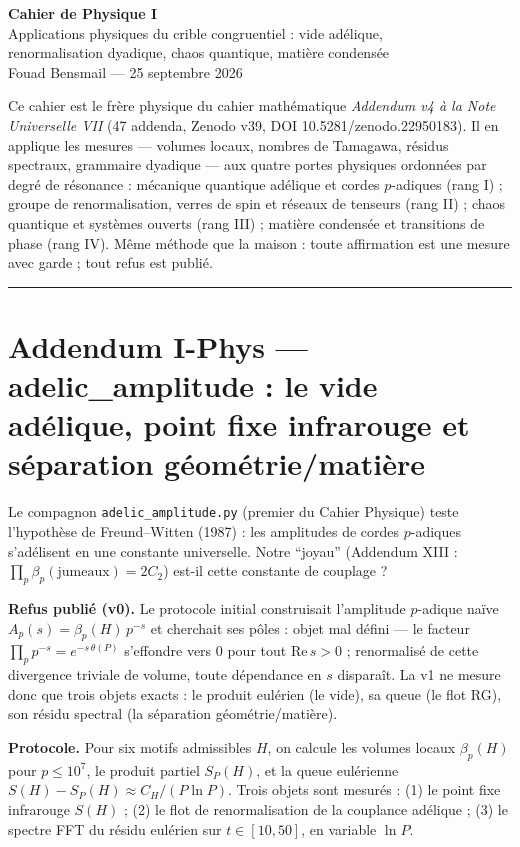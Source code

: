 \documentclass[11pt,a4paper]{article}
\begin{document}
\begin{center}
{\LARGE\textbf{Cahier de Physique I}}\\
\large Applications physiques du crible congruentiel : vide adélique,\\
renormalisation dyadique, chaos quantique, matière condensée\\
Fouad Bensmail --- 25 septembre 2026
\end{center}

Ce cahier est le frère physique du cahier mathématique \emph{Addendum v4 à la
Note Universelle VII} (47 addenda, Zenodo v39, DOI 10.5281/zenodo.22950183).
Il en applique les mesures --- volumes locaux, nombres de Tamagawa, résidus
spectraux, grammaire dyadique --- aux quatre portes physiques ordonnées par
degré de résonance : mécanique quantique adélique et cordes $p$-adiques
(rang I) ; groupe de renormalisation, verres de spin et réseaux de tenseurs
(rang II) ; chaos quantique et systèmes ouverts (rang III) ; matière
condensée et transitions de phase (rang IV). Même méthode que la maison :
toute affirmation est une mesure avec garde ; tout refus est publié.

\vspace{0.5cm}
\hrule
\vspace{0.5cm}

\section*{Addendum I-Phys --- adelic\_amplitude : le vide adélique, point fixe infrarouge et séparation géométrie/matière}

Le compagnon \texttt{adelic\_amplitude.py} (premier du Cahier Physique) teste
l'hypothèse de Freund--Witten (1987) : les amplitudes de cordes $p$-adiques
s'adélisent en une constante universelle. Notre ``joyau'' (Addendum XIII :
$\prod_p \beta_p(\text{jumeaux}) = 2C_2$) est-il cette constante de
couplage ?

\textbf{Refus publié (v0).} Le protocole initial construisait l'amplitude
$p$-adique naïve $A_p(s) = \beta_p(H)\,p^{-s}$ et cherchait ses pôles :
objet mal défini --- le facteur $\prod_p p^{-s} = e^{-s\,\theta(P)}$
s'effondre vers $0$ pour tout $\mathrm{Re}\,s > 0$ ; renormalisé de cette
divergence triviale de volume, toute dépendance en $s$ disparaît. La v1 ne
mesure donc que trois objets exacts : le produit eulérien (le vide), sa
queue (le flot RG), son résidu spectral (la séparation géométrie/matière).

\textbf{Protocole.} Pour six motifs admissibles $H$, on calcule les volumes
locaux $\beta_p(H)$ pour $p \le 10^7$, le produit partiel $S_P(H)$, et la
queue eulérienne $S(H) - S_P(H) \approx C_H/(P \ln P)$. Trois objets sont
mesurés : (1) le point fixe infrarouge $S(H)$ ; (2) le flot de
renormalisation de la couplance adélique ; (3) le spectre FFT du résidu
eulérien sur $t \in [10, 50]$, en variable $\ln P$.
\end{document}
